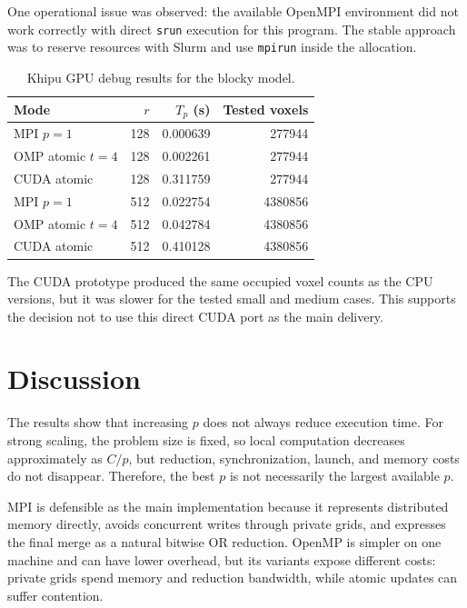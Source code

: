 \documentclass[conference]{IEEEtran}
\begin{document}
One operational issue was observed: the available OpenMPI environment did not
work correctly with direct \texttt{srun} execution for this program. The stable
approach was to reserve resources with Slurm and use \texttt{mpirun} inside the
allocation.

\begin{table}[t]
  \centering
  \caption{Khipu GPU debug results for the blocky model.}
  \begin{tabular}{lrrr}
    \toprule
    Mode             & $r$ & $T_p$ (s) & Tested voxels \\
    \midrule
    MPI $p=1$        & 128 & 0.000639  & 277944        \\
    OMP atomic $t=4$ & 128 & 0.002261  & 277944        \\
    CUDA atomic      & 128 & 0.311759  & 277944        \\
    MPI $p=1$        & 512 & 0.022754  & 4380856       \\
    OMP atomic $t=4$ & 512 & 0.042784  & 4380856       \\
    CUDA atomic      & 512 & 0.410128  & 4380856       \\
    \bottomrule
  \end{tabular}
\end{table}

The CUDA prototype produced the same occupied voxel counts as the CPU versions,
but it was slower for the tested small and medium cases. This supports the
decision not to use this direct CUDA port as the main delivery.

\section{Discussion}

The results show that increasing $p$ does not always reduce execution time. For
strong scaling, the problem size is fixed, so local computation decreases
approximately as $C/p$, but reduction, synchronization, launch, and memory
costs do not disappear. Therefore, the best $p$ is not necessarily the largest
available $p$.

MPI is defensible as the main implementation because it represents distributed
memory directly, avoids concurrent writes through private grids, and expresses
the final merge as a natural bitwise OR reduction. OpenMP is simpler on one
machine and can have lower overhead, but its variants expose different costs:
private grids spend memory and reduction bandwidth, while atomic updates can
suffer contention.
\end{document}
